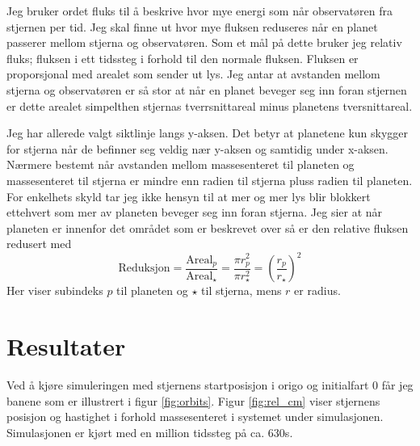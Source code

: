 \documentclass[reprint, english,notitlepage]{revtex4-1}  %
\begin{document}
Jeg bruker ordet fluks til å beskrive hvor mye energi som når observatøren fra stjernen per tid. Jeg skal finne ut hvor mye fluksen reduseres når en planet passerer mellom stjerna og observatøren. Som et mål på dette bruker jeg relativ fluks; fluksen i ett tidssteg i forhold til den normale fluksen. Fluksen er proporsjonal med arealet som sender ut lys. Jeg antar at avstanden mellom stjerna og observatøren er så stor at når en planet beveger seg inn foran stjernen er dette arealet simpelthen stjernas tverrsnittareal minus planetens tversnittareal.

Jeg har allerede valgt siktlinje langs y-aksen. Det betyr at planetene kun skygger for stjerna når de befinner seg veldig nær y-aksen og samtidig under x-aksen. Nærmere bestemt når avstanden mellom massesenteret til planeten og massesenteret til stjerna er mindre enn radien til stjerna pluss radien til planeten. For enkelhets skyld tar jeg ikke hensyn til at mer og mer lys blir blokkert ettehvert som mer av planeten beveger seg inn foran stjerna. Jeg sier at når planeten er innenfor det området som er beskrevet over så er den relative fluksen redusert med \[\text{Reduksjon} = \frac{\text{Areal}_p}{\text{Areal}_{\star}} = \frac{\pi r_p^2}{\pi r_{\star}^2} = \left(\frac{r_p}{r_{\star}}\right)^2 \]
Her viser subindeks $p$ til planeten og $\star$ til stjerna, mens $r$ er radius.



\section{Resultater}

Ved å kjøre simuleringen med stjernens startposisjon i origo og initialfart 0 får jeg banene som
 er illustrert i figur \ref{fig:orbits}. Figur \ref{fig:rel_cm} viser stjernens posisjon og hastighet i forhold massesenteret i systemet under simulasjonen. Simulasjonen er kjørt med en million tidssteg på ca. 630s.
\end{document}
